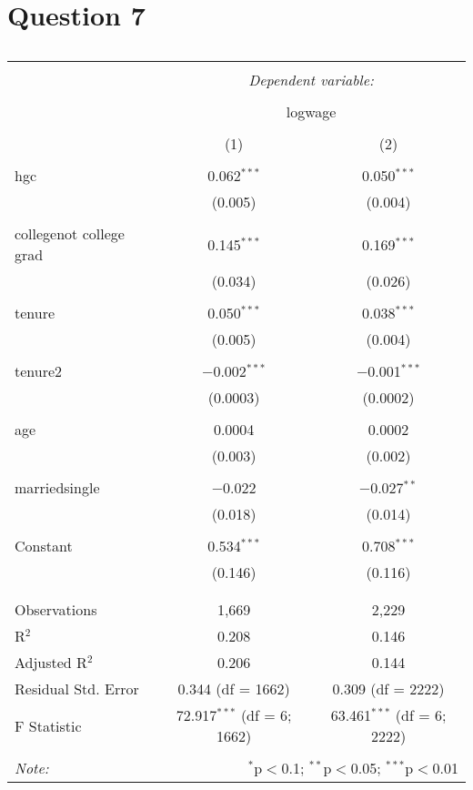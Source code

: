 \documentclass{article}
\begin{document}
\section{Question 7}
\begin{table}[!htbp] \centering 
  \caption{} 
  \label{} 
\begin{tabular}{@{\extracolsep{5pt}}lcc} 
\\[-1.8ex]\hline 
\hline \\[-1.8ex] 
 & \multicolumn{2}{c}{\textit{Dependent variable:}} \\ 
\cline{2-3} 
\\[-1.8ex] & \multicolumn{2}{c}{logwage} \\ 
\\[-1.8ex] & (1) & (2)\\ 
\hline \\[-1.8ex] 
 hgc & 0.062$^{***}$ & 0.050$^{***}$ \\ 
  & (0.005) & (0.004) \\ 
  & & \\ 
 collegenot college grad & 0.145$^{***}$ & 0.169$^{***}$ \\ 
  & (0.034) & (0.026) \\ 
  & & \\ 
 tenure & 0.050$^{***}$ & 0.038$^{***}$ \\ 
  & (0.005) & (0.004) \\ 
  & & \\ 
 tenure2 & $-$0.002$^{***}$ & $-$0.001$^{***}$ \\ 
  & (0.0003) & (0.0002) \\ 
  & & \\ 
 age & 0.0004 & 0.0002 \\ 
  & (0.003) & (0.002) \\ 
  & & \\ 
 marriedsingle & $-$0.022 & $-$0.027$^{**}$ \\ 
  & (0.018) & (0.014) \\ 
  & & \\ 
 Constant & 0.534$^{***}$ & 0.708$^{***}$ \\ 
  & (0.146) & (0.116) \\ 
  & & \\ 
\hline \\[-1.8ex] 
Observations & 1,669 & 2,229 \\ 
R$^{2}$ & 0.208 & 0.146 \\ 
Adjusted R$^{2}$ & 0.206 & 0.144 \\ 
Residual Std. Error & 0.344 (df = 1662) & 0.309 (df = 2222) \\ 
F Statistic & 72.917$^{***}$ (df = 6; 1662) & 63.461$^{***}$ (df = 6; 2222) \\ 
\hline 
\hline \\[-1.8ex] 
\textit{Note:}  & \multicolumn{2}{r}{$^{*}$p$<$0.1; $^{**}$p$<$0.05; $^{***}$p$<$0.01} \\ 
\end{tabular} 
\end{table}
\end{document}

